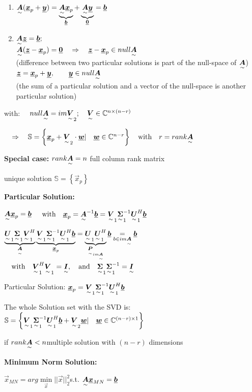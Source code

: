 \begin{enumerate}
\item $\ma{A}(\vec{x}_p+\vec{y})=\underbrace{\ma{A}\vec{x}_p}_{\vec{b}}+\underbrace{\ma{A}\vec{y}}_{\vec{0}}=\vec{b}$
\item $\ma{A}\vec{z}=\vec{b};$
\\
$\ma{A}(\vec{z}-\vec{x}_p)=\vec{0}\pfeil \vec{z}-\vec{x}_p\in null\ma{A}$
\\ {\footnotesize(difference between two particular solutions is part of the null-space of $\ma{A}$)}
\\
$\vec{z}=\vec{x}_p+\vec{y}, \qquad \vec{y}\in null\ma{A}$
\\ {\footnotesize(the sum of a particular solution and a vector of the null-space is another particular solution)}
\end{enumerate}

with: $\quad null\ma{A}=im\ma{V}_2; \quad \ma{V}\in\mathbb{C}^{n\times (n-r)}$

$\pfeil\mathbb{S}=\left\lbrace \vec{x}_p+\ma{V}_2\cdot\vec{w} |\quad \vec{w}\in \mathbb{C}^{n-r} \right\rbrace \with r=rank\ma{A}$


\textbf{Special case: } 
$rank\ma{A}=n$ \qquad full column rank matrix 

unique solution \quad $\mathbb{S}=\left\lbrace \vec{x}_p  \right\rbrace$

\textbf{Particular Solution:}

$\ma{A}\vec{x}_p=\vec{b}$
$\with \vec{x}_p=\ma{A}^{-1}\vec{b}=\ma{V}_1\ma{\Sigma}_1^{-1}\ma{U}_1^H\vec{b} $

$\underbrace{\ma{U}_1\ma{\Sigma}_1\ma{V}_1^H}_{\ma{A}}\underbrace{\ma{V}_1\ma{\Sigma}_1^{-1}\ma{U}_1^H\vec{b}}_{\vec{x}_p}=\underbrace{\ma{U}_1\ma{U}_1^H}_{\ma{P}_{im\ma{A}}}\vec{b}\underset{b\in im\ma{A}}{=}\vec{b}$
$\with \ma{V}_1^H\ma{V}_1=\ma{I}, \quad \text{and}\quad \ma{\Sigma}_1\ma{\Sigma}_1^{-1}=\ma{I} $

Particular Solution: $\vec{x}_p=\ma{V}_1\ma{\Sigma}_1^{-1}\ma{U}_1^H\vec{b}$

The whole Solution set with the SVD is: \quad
$\mathbb{S}=\left\lbrace \ma{V}_1\ma{\Sigma}_1^{-1}\ma{U}_1^H\vec{b}+\ma{V}_2\vec{w} |\quad \vec{w}\in \mathbb{C}^{(n-r)\times 1} \right\rbrace$ 

if $rank\ma{A}<n$\pfeil multiple solution with  $(n-r)$ dimensions 


\textbf{Minimum Norm Solution:}

$\vec{x}_{MN}=arg\min\limits_{\vec{x}}||\vec{x}||^2_2$\quad s.t. $\ma{A}\vec{x}_{MN}=\vec{b}$


